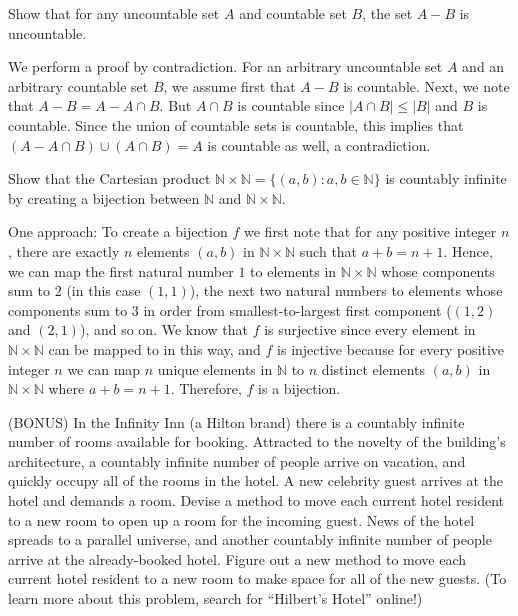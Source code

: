 \documentclass[solution, letterpaper]{cs20inclass}
\begin{document}
\problem Show that for any uncountable set $A$ and countable set $B$, the set $A-B$ is uncountable.

\begin{solution}
We perform a proof by contradiction. For an arbitrary uncountable set $A$ and an arbitrary
countable set $B$, we assume first that $A - B$ is countable. Next, we note that $A - B = A - A \cap B$. But $A \cap B$ is countable since $|A \cap B| \leq |B|$ and $B$ is countable. Since the union of countable sets is countable, this implies that $(A - A \cap B) \cup (A \cap B) = A$ is countable as well, a contradiction.
\end{solution}

\problem Show that the Cartesian product $\mathbb{N} \times \mathbb{N} = \{(a,b):a,b \in \mathbb{N}\}$ is countably infinite by creating a bijection between $\mathbb{N}$ and $\mathbb{N} \times \mathbb{N}$.

\begin{solution}
One approach: To create a bijection $f$ we first note that for any positive integer $n$, there are exactly $n$ elements $(a,b)$ in $\mathbb{N} \times \mathbb{N} $ such that $a + b = n + 1$. Hence, we can map the first natural number $1$ to elements in $\mathbb{N} \times \mathbb{N} $ whose components sum to $2$ (in this case $(1,1)$), the next two natural numbers to elements whose components sum to $3$ in order from smallest-to-largest first component ($(1,2)$ and $(2,1)$), and so on. We know that $f$ is surjective since every element in $\mathbb{N} \times \mathbb{N} $ can be mapped to in this way, and $f$ is injective because for every positive integer $n$ we can map $n$ unique elements in $\mathbb{N}$ to $n$ distinct elements $(a,b)$ in $\mathbb{N} \times \mathbb{N} $ where $a + b = n + 1$. Therefore, $f$ is a bijection.
\end{solution}

\problem (BONUS) In the Infinity Inn (a Hilton brand) there is a countably infinite number of rooms available for booking. Attracted to the novelty of the building's architecture, a countably infinite number of people arrive on vacation, and quickly occupy all of the rooms in the hotel.
\subproblem A new celebrity guest arrives at the hotel and demands a room. Devise a method to move each current hotel resident to a new room to open up a room for the incoming guest.
\subproblem News of the hotel spreads to a parallel universe, and another countably infinite number of people arrive at the already-booked hotel. Figure out a new method to move each current hotel resident to a new room to make space for all of the new guests. (To learn more about this problem, search for ``Hilbert's Hotel'' online!)
\end{document}
